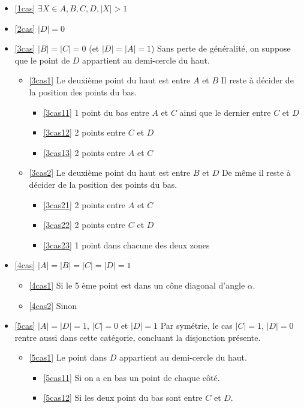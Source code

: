 \begin{itemize}
	\item \ref{1cas} $\exists X \in {A,B,C,D}, |X| > 1$
	\item \ref{2cas} $|D| = 0$
	\item \ref{3cas} $|B| = |C| = 0$ (et $|D| = |A| = 1$)
	Sans perte de généralité, on suppose que le point de $D$ appartient au demi-cercle du haut.
	\begin{itemize}
		\item \ref{3cas1} Le deuxième point du haut est entre $A$ et $B$
		Il reste à décider de la position des points du bas.
		\begin{itemize}
			\item \ref{3cas11} 1 point du bas entre $A$ et $C$ ainsi que le dernier entre $C$ et $D$
			\item \ref{3cas12} 2 points entre $C$ et $D$
			\item \ref{3cas13} 2 points entre $A$ et $C$
		\end{itemize}
		\item \ref{3cas2} Le deuxième point du haut est entre $B$ et $D$
		De même il reste à décider de la position des points du bas.
		\begin{itemize}
			\item \ref{3cas21} 2 points entre $A$ et $C$
			\item \ref{3cas22} 2 points entre $C$ et $D$
			\item \ref{3cas23} 1 point dans chacune des deux zones
		\end{itemize}
	\end{itemize}
	\item \ref{4cas} $|A| = |B| = |C| = |D| = 1$
	\begin{itemize}
		\item \ref{4cas1} Si le 5 ème point est dans un cône diagonal d'angle $\alpha$.
		\item \ref{4cas2} Sinon
	\end{itemize}
	\item \ref{5cas} $|A| = |D| = 1$, $|C| = 0$ et $|D| = 1$
		Par symétrie, le cas $|C| = 1$, $|D| = 0$ rentre aussi dans cette catégorie, concluant la disjonction présente.
	\begin{itemize}
		\item \ref{5cas1} Le point dans $D$ appartient au demi-cercle du haut.
		\begin{itemize}
			\item \ref{5cas11} Si on a en bas un point de chaque côté.
			\item \ref{5cas12} Si les deux point du bas sont entre $C$ et $D$.

\end{itemize}
\end{itemize}
\end{itemize}

